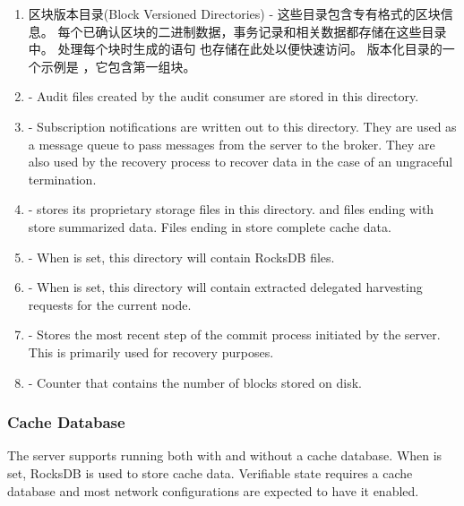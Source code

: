 \begin{enumerate}
	\item{区块版本目录(Block Versioned Directories) -
		这些目录包含专有格式的区块信息。
		每个已确认区块的二进制数据，事务记录和相关数据都存储在这些目录中。
		处理每个块时生成的语句 也存储在此处以便快速访问。
		版本化目录的一个示例是 ，它包含第一组块。
	}
	\item{ - Audit files created by the audit consumer  are stored in this directory.}
	\item{ -
		Subscription notifications are written out to this directory.
		They are used as a message queue to pass messages from the server to the broker.
		They are also used by the recovery process to recover data in the case of an ungraceful termination.
	}
	\item{ -
		\codenamespace stores its proprietary storage files in this directory.
		 and files ending with  store summarized data.
		Files ending in  store complete cache data.
	}
	\item{ - When  is set, this directory will contain RocksDB files.}
	\item{ -
		When  is set, this directory will contain extracted delegated harvesting requests for the current node.
	}
	\item{ -
		Stores the most recent step of the commit process initiated by the server.
		This is primarily used for recovery purposes.
	}
	\item{ - Counter that contains the number of blocks stored on disk.}
\end{enumerate}

\subsubsection{Cache Database}

The server supports running both with and without a cache database.
When  is set, RocksDB is used to store cache data.
Verifiable state  requires a cache database and most network configurations are expected to have it enabled.

